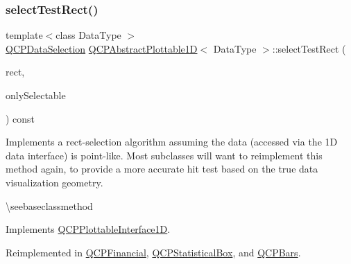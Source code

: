\mbox{\label{class_q_c_p_abstract_plottable1_d_a22377bf6e57ab7eedbc9e489250c6ded}} 
\subsubsection{\texorpdfstring{selectTestRect()}{selectTestRect()}}
{\footnotesize\ttfamily template$<$class Data\+Type $>$ \\
\mbox{\hyperlink{class_q_c_p_data_selection}{Q\+C\+P\+Data\+Selection}} \mbox{\hyperlink{class_q_c_p_abstract_plottable1_d}{Q\+C\+P\+Abstract\+Plottable1D}}$<$ Data\+Type $>$\+::select\+Test\+Rect (\begin{DoxyParamCaption}\item[{const Q\+RectF \&}]{rect,  }\item[{bool}]{only\+Selectable }\end{DoxyParamCaption}) const\hspace{0.3cm}{\ttfamily [virtual]}}

Implements a rect-\/selection algorithm assuming the data (accessed via the 1D data interface) is point-\/like. Most subclasses will want to reimplement this method again, to provide a more accurate hit test based on the true data visualization geometry.

\textbackslash{}seebaseclassmethod 

Implements \mbox{\hyperlink{class_q_c_p_plottable_interface1_d_a67093e4ccf490ff5f7750640941ff34c}{Q\+C\+P\+Plottable\+Interface1D}}.



Reimplemented in \mbox{\hyperlink{class_q_c_p_financial_a3c5beb1ab028a1dba845fc9dcffc7cf4}{Q\+C\+P\+Financial}}, \mbox{\hyperlink{class_q_c_p_statistical_box_a42febad6ad5e924a151434cc434b4ffc}{Q\+C\+P\+Statistical\+Box}}, and \mbox{\hyperlink{class_q_c_p_bars_ab03bb6125c3e983b89d694f75ce6b3d5}{Q\+C\+P\+Bars}}.

\mbox{\label{class_q_c_p_abstract_plottable1_d_afe0d56e39cc076032922f059b304c092}} 
